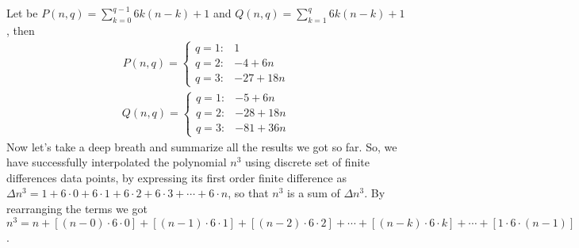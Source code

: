 Let be $P(n, q) = \sum_{k=0}^{q-1} 6k(n-k) + 1$ and $Q(n, q) = \sum_{k=1}^{q} 6k(n-k) + 1$, then
\begin{align*}
    P(n, q) =
    \begin{cases}
        q = 1: & 1 \\
        q = 2: & -4 + 6 n \\
        q = 3: & -27 + 18 n
    \end{cases}
\end{align*}
\begin{align*}
    Q(n, q) =
    \begin{cases}
        q = 1: & -5 + 6 n \\
        q = 2: & -28 + 18 n \\
        q = 3: & -81 + 36 n
    \end{cases}
\end{align*}
Now let's take a deep breath and summarize all the results we got so far.
So, we have successfully interpolated the polynomial $n^3$ using discrete set of finite differences data points,
by expressing its first order finite difference as $\Delta n^3 = 1+6\cdot0+6\cdot1+6\cdot2+6\cdot3+\cdots+6\cdot n$,
so that $n^3$ is a sum of $\Delta n^3$.
By rearranging the terms we got $n^3 = n + [(n-0) \cdot 6 \cdot 0] + [(n-1)\cdot6\cdot1] + [(n-2)\cdot6\cdot2]
+ \cdots + [(n-k)\cdot 6 \cdot k] + \cdots + [1\cdot6\cdot(n-1)]$.
